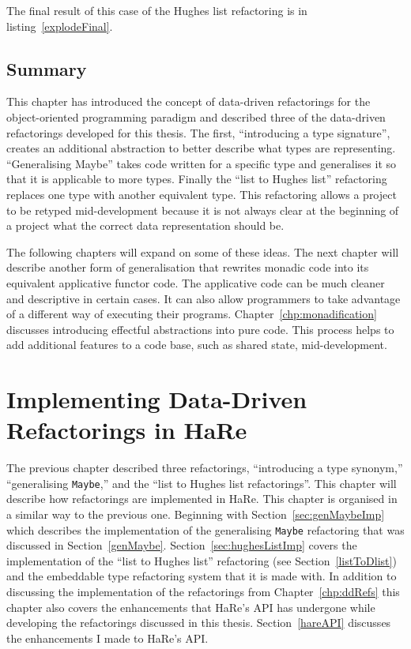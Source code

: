 The final result of this case of the Hughes list refactoring is in listing~\ref{explodeFinal}.

\section{Summary}

This chapter has introduced the concept of data-driven refactorings for the object-oriented programming paradigm and described three of the data-driven refactorings developed for this thesis. The first, ``introducing a type signature'', creates an additional abstraction to better describe what types are representing. ``Generalising Maybe'' takes code written for a specific type and generalises it so that it is applicable to more types. Finally the ``list to Hughes list'' refactoring replaces one type with another equivalent type. This refactoring allows a project to be retyped mid-development because it is not always clear at the beginning of a project what the correct data representation should be.

The following chapters will expand on some of these ideas. The next chapter will describe another form of generalisation that rewrites monadic code into its equivalent applicative functor code. The applicative code can be much cleaner and descriptive in certain cases. It can also allow programmers to take advantage of a different way of executing their programs. Chapter~\ref{chp:monadification} discusses introducing effectful abstractions into pure code. This process helps to add additional features to a code base, such as shared state, mid-development.

\chapter{Implementing Data-Driven Refactorings in HaRe}
\label{chp:generalImp}

\renewcommand{\topfraction}{1}
\renewcommand{\floatpagefraction}{1}

The previous chapter described three refactorings, ``introducing a type synonym,'' ``generalising \texttt{Maybe},'' and the ``list to Hughes list refactorings''. This chapter will describe how refactorings are implemented in HaRe. This chapter is organised in a similar way to the previous one. Beginning with Section~\ref{sec:genMaybeImp} which describes the implementation of the generalising \texttt{Maybe} refactoring that was discussed in Section~\ref{genMaybe}. Section~\ref{sec:hughesListImp} covers the implementation of the ``list to Hughes list'' refactoring (see Section~\ref{listToDlist}) and the embeddable type refactoring system that it is made with. In addition to discussing the implementation of the refactorings from Chapter~\ref{chp:ddRefs} this chapter also covers the enhancements that HaRe's API has undergone while developing the refactorings discussed in this thesis. Section~\ref{hareAPI} discusses the enhancements I made to HaRe's API.

